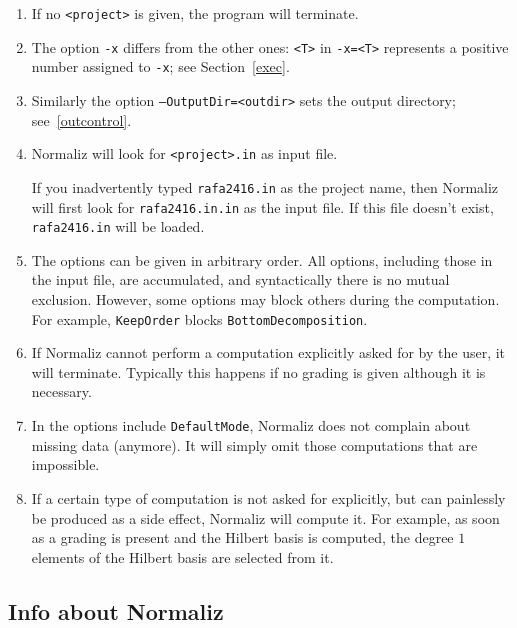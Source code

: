 \documentclass[12pt,a4paper]{scrartcl}
\theoremstyle{definition}
\def\ttt{\texttt}
\begin{document}
\begin{enumerate}
	\item If no \ttt{<project>} is given, the
	program will terminate.
	
	\item The option \ttt{-x} differs from the other ones: \ttt{<T>} in \verb|-x=<T>|
	represents a positive number assigned to \ttt{-x}; see
	Section~\ref{exec}.
	
	\item Similarly the option \ttt{---OutputDir=<outdir>} sets the output directory; see~\ref{outcontrol}.
	
	\item Normaliz will look for \ttt{<project>.in} as input
	file.
	
	If you inadvertently typed \ttt{rafa2416.in} as the project
	name, then Normaliz will first look for \ttt{rafa2416.in.in}
	as the input file. If this file doesn't exist,
	\ttt{rafa2416.in} will be loaded.
	
	\item The options can be given in arbitrary order. All options, including those in the input file, are accumulated, and syntactically there is no mutual exclusion. However, some options may block others during the computation. For example, \verb|KeepOrder| blocks \verb|BottomDecomposition|.
	
	\item If Normaliz cannot perform a computation explicitly asked for by the
	user, it will terminate. Typically this happens if no grading is given although
	it is necessary.
	
	\item In the options include \verb|DefaultMode|, Normaliz does not complain about missing data
	(anymore). It will simply omit those computations that are impossible.
	
	\item If a certain type of computation is not asked for explicitly, but can
	painlessly be produced as a side effect, Normaliz will compute it. For
	example, as soon as a grading is present and the Hilbert basis is computed, the
	degree $1$ elements of the Hilbert basis are selected from it.
	
\end{enumerate}

\subsection{Info about Normaliz}
\end{document}
